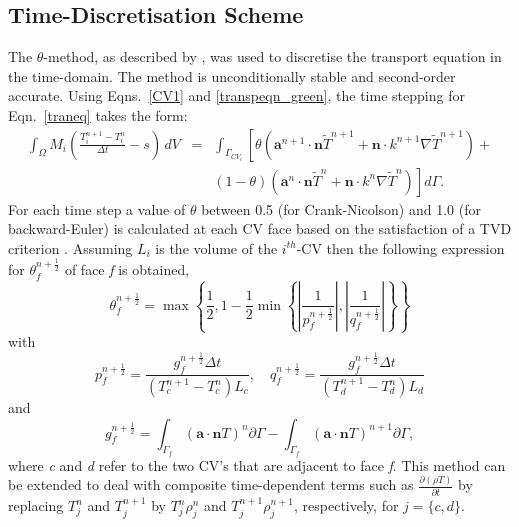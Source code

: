 \documentclass[preprint,authoryear,12pt]{elsarticle}
\begin{document}
\subsection{Time-Discretisation Scheme} \label{time_discretisation}
The $\theta$-method, as described by \citet{gomes_book_2012}, was used to discretise the transport equation in the time-domain. The method is unconditionally stable and second-order accurate. Using Eqns.~\ref{CV1} and \ref{transpeqn_green}, the time stepping for Eqn.~\ref{traneq} takes the form:
\begin{eqnarray}
  \int_{\Omega} M_{i} \left( \displaystyle\frac{T_{i}^{n+1}
    -T_{i}^{n}}{\Delta t} - s \right) \,dV &=& \int_{\Gamma_{CV_{i}}}
  \left[\theta\left(\mathbf{a}^{n+1}\cdot \mathbf{n}
    \widetilde{T}^{n+1} +\mathbf{n}\cdot k^{n+1}\nabla
    \widetilde{T}^{n+1} \right) + \right.\nonumber
    \\ &&\left. \left(1-\theta\right)\left(\mathbf{a}^{n}\cdot
    \mathbf{n} \widetilde{T}^{n} +\mathbf{n}\cdot k^{n}\nabla
    \widetilde{T}^{n} \right) \right]d\Gamma.
  \label{theta}
\end{eqnarray} 
For each time step a value of $\theta$ between 0.5 (for Crank-Nicolson) and 1.0 (for backward-Euler) is calculated at each CV face based on the satisfaction of a TVD criterion \citep{szabo_2009,kuzmin_2004}. Assuming $L_{i}$ is the volume of the  $i^{th}$-CV then the following expression for $\theta_f^{n+\frac{1}{2}}$ of face \textit{f} is obtained,
\begin{equation}
  \theta_f^{n+\frac{1}{2}}=\max \left\{ \frac{1}{2}, 1 - \displaystyle\frac{1}{2}  \min\left\{\left|\frac{1}{p_{f}^{n+\frac{1}{2}}}\right|, \left|\frac{1}{q_{f}^{n+\frac{1}{2}}} \right| \right\} \right\}
  \label{thet1}
\end{equation}
with
\begin{displaymath}
  p_{f}^{n+\frac{1}{2}} = \displaystyle\frac{g_{f}^{n+\frac{1}{2}}\Delta t}{(T^{n+1}_{c} - T_{c}^{n}) L_{c}} , \quad q_{f}^{n+\frac{1}{2}} = \displaystyle\frac{g_{f}^{n+\frac{1}{2}}\Delta t}{(T^{n+1}_{d} - T_{d}^{n}) L_{d}}
  \label{thet2}
\end{displaymath}
and
\begin{displaymath}
  g_f^{n+\frac{1}{2}}= \int_{\Gamma_f}\left(\bm{a} \cdot \mathbf{n} T\right)^{n} \partial\Gamma - \int_{\Gamma_f}\left(\bm{a} \cdot \mathbf{n} T\right)^{n+1}
  \partial\Gamma,
\end{displaymath}
where \textit{c} and \textit{d} refer to the two CV's that are adjacent to face \textit{f}. This method can be extended \citep[as demonstrated by][]{gomes_2008,pain_2001b} to deal with composite time-dependent terms such as $\displaystyle\frac{\partial \left(\rho T\right)}{\partial t}$ by replacing $T_j^n$ and $T_j^{n+1}$ by $T_{j}^{n} \rho_{j}^{n}$ and $T_{j}^{n+1} \rho_j^{n+1}$, respectively, for $j = \{c,d\}$.
\end{document}
